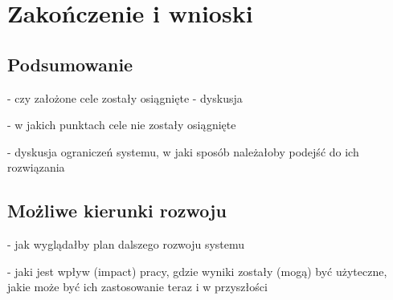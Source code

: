 \chapter{Zakończenie i wnioski}

\begin{comment}

\end{comment}
\section{Podsumowanie}
- czy założone cele zostały osiągnięte - dyskusja

- w jakich punktach cele nie zostały osiągnięte

- dyskusja ograniczeń systemu, w jaki sposób należałoby podejść do ich
rozwiązania
\section{Możliwe kierunki rozwoju}
- jak wyglądałby plan dalszego rozwoju systemu

- jaki jest wpływ (impact) pracy, gdzie wyniki zostały (mogą) być użyteczne,
jakie może być ich zastosowanie teraz i w przyszłości

